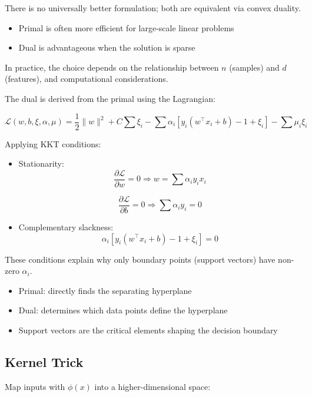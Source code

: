 \documentclass[10pt,a4paper]{article}
\begin{document}
	
		There is no universally better formulation; both are equivalent via convex duality.
	
		\begin{itemize}
			\item Primal is often more efficient for large-scale linear problems
			\item Dual is advantageous when the solution is sparse
		\end{itemize}
	
		In practice, the choice depends on the relationship between $n$ (samples) and $d$ (features), and computational considerations.
	
	
		The dual is derived from the primal using the Lagrangian:
	
		\[
		\mathcal{L}(w,b,\xi,\alpha,\mu) = \frac{1}{2}\|w\|^2 + C \sum \xi_i
		- \sum \alpha_i [y_i(w^\top x_i + b) - 1 + \xi_i] - \sum \mu_i \xi_i
		\]
	
		Applying KKT conditions:
	
		\begin{itemize}
			\item Stationarity:
			\[
			\frac{\partial \mathcal{L}}{\partial w} = 0 \Rightarrow
			w = \sum \alpha_i y_i x_i
			\]
	
			\[
			\frac{\partial \mathcal{L}}{\partial b} = 0 \Rightarrow
			\sum \alpha_i y_i = 0
			\]
	
			\item Complementary slackness:
			\[
			\alpha_i [y_i(w^\top x_i + b) - 1 + \xi_i] = 0
			\]
		\end{itemize}
	
		These conditions explain why only boundary points (support vectors) have non-zero $\alpha_i$.
	
		\vspace{0.5em}
	
		\begin{itemize}
			\item Primal: directly finds the separating hyperplane
			\item Dual: determines which data points define the hyperplane
			\item Support vectors are the critical elements shaping the decision boundary
		\end{itemize}
	
	
	
		\subsection{Kernel Trick}
		Map inputs with $\phi(x)$ into a higher-dimensional space:
	
\end{document}
